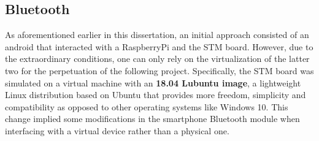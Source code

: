 \subsection{Bluetooth}%
\label{sec:bluetooth-implem}
%
As aforementioned earlier in this dissertation, an initial approach consisted of an android that interacted with a RaspberryPi and the STM board.
%
However, due to the extraordinary conditions, one can only rely on the virtualization of the latter two for the perpetuation of the following project.
Specifically, the STM board was simulated on a virtual machine with an \textbf{18.04 Lubuntu image}, a lightweight Linux distribution based on Ubuntu that provides more freedom, simplicity and compatibility as opposed to other operating systems like Windows 10.
%
This change implied some modifications in the smartphone Bluetooth module when interfacing with a virtual device rather than a physical one.
%
